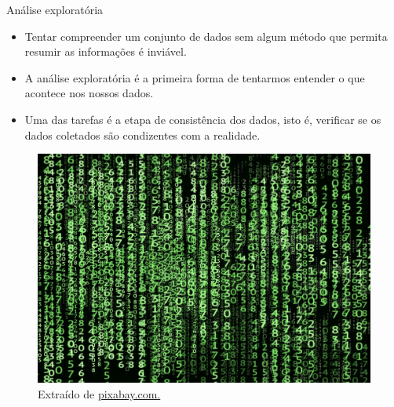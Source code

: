 \documentclass[
  ignorenonframetext,
  serif,
  professionalfont,
  usenames,
  dvipsnames,
  aspectratio = 169]{beamer}
\providecommand{\tightlist}{%
  \setlength{\itemsep}{0pt}\setlength{\parskip}{0pt}}
\renewcommand{\tightlist}{%
  \setlength{\itemsep}{0\baselineskip}
  \setlength{\parskip}{0.25\baselineskip}
}
\def\beginAHalfColumn{\begin{minipage}{0.49\textwidth}}%
\def\endColumns{\end{minipage}}%
\begin{document}
\begin{frame}{Análise exploratória}
\label{anuxe1lise-exploratuxf3ria-4}
\beginAHalfColumn

\begin{itemize}
\tightlist
\item
  Tentar compreender um conjunto de dados sem algum método que permita
  resumir as informações é inviável.
\end{itemize}

\vspace{0.3cm}

\begin{itemize}
\tightlist
\item
  A análise exploratória é a primeira forma de tentarmos entender o que
  acontece nos nossos dados.
\end{itemize}

\vspace{0.3cm}

\begin{itemize}
\tightlist
\item
  Uma das tarefas é a etapa de consistência dos dados, isto é, verificar
  se os dados coletados são condizentes com a realidade.
\end{itemize}

\endColumns
\beginAHalfColumn

\begin{figure}

{\centering \includegraphics[width=0.9\linewidth]{./img/dados} 

}

\caption{Extraído de \href{https://cdn.pixabay.com/photo/2018/01/26/18/21/matrix-3109378_1280.jpg}{pixabay.com.}}\label{fig:unnamed-chunk-31}
\end{figure}

\endColumns
\end{frame}
\end{document}
